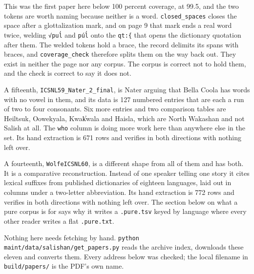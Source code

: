 This was the first paper here below 100 percent coverage, at 99.5, and the two tokens are worth naming because neither is a word. \texttt{closed\_\allowbreak{}spaces} closes the space after a glottalization mark, and on page 9 that mark ends a real word twice, welding \texttt{√pul̕} and \texttt{púl̕} onto the \texttt{qt:\{} that opens the dictionary quotation after them. The welded tokens hold a brace, the record delimits its spans with braces, and \texttt{coverage\_\allowbreak{}check} therefore splits them on the way back out. They exist in neither the page nor any corpus. The corpus is correct not to hold them, and the check is correct to say it does not.

A fifteenth, \texttt{ICSNL59\_\allowbreak{}Nater\_\allowbreak{}2\_\allowbreak{}final}, is Nater arguing that Bella Coola has words with no vowel in them, and its data is 127 numbered entries that are each a run of two to four consonants. Six more entries and two comparison tables are Heiltsuk, Oowekyala, Kwak̓wala and Haisla, which are North Wakashan and not Salish at all. The \texttt{who} column is doing more work here than anywhere else in the set. Its hand extraction is 671 rows and verifies in both directions with nothing left over.

A fourteenth, \texttt{Wolfe\allowbreak{}ICSNL60}, is a different shape from all of them and has both. It is a comparative reconstruction. Instead of one speaker telling one story it cites lexical suffixes from published dictionaries of eighteen languages, laid out in columns under a two-letter abbreviation. Its hand extraction is 772 rows and verifies in both directions with nothing left over. The section below on what a pure corpus is for says why it writes a \texttt{.\allowbreak{}pure.\allowbreak{}tsv} keyed by language where every other reader writes a flat \texttt{.\allowbreak{}pure.\allowbreak{}txt}.

Nothing here needs fetching by hand. \texttt{python maint/\allowbreak{}data/\allowbreak{}salishan/\allowbreak{}get\_\allowbreak{}papers.\allowbreak{}py} reads the archive index, downloads these eleven and converts them. Every address below was checked; the local filename in \texttt{build/\allowbreak{}papers/\allowbreak{}} is the PDF's own name.

